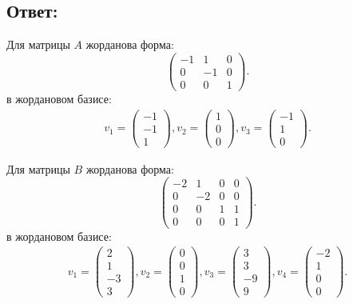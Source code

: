 \documentclass[12pt]{article}
\begin{document}
    \subsection*{Ответ:}
    Для матрицы $A$ жорданова форма:
    \[
        \begin{pmatrix}
            -1 & 1  & 0 \\
            0  & -1 & 0 \\
            0  & 0  & 1
        \end{pmatrix}.
    \]
    в жордановом базисе:
    \begin{gather*}
        v_1 = \begin{pmatrix}
                  -1 \\ -1 \\ 1
        \end{pmatrix},
        v_2 = \begin{pmatrix}
                  1 \\ 0 \\ 0
        \end{pmatrix},
        v_3 = \begin{pmatrix}
                  -1 \\ 1 \\ 0
        \end{pmatrix} .
    \end{gather*}

    Для матрицы $B$ жорданова форма:
    \[
        \begin{pmatrix}
            -2 & 1  & 0 & 0 \\
            0  & -2 & 0 & 0 \\
            0  & 0  & 1 & 1 \\
            0  & 0  & 0 & 1
        \end{pmatrix}.
    \]
    в жордановом базисе:
    \begin{gather*}
        v_1 = \begin{pmatrix}
                  2 \\ 1 \\ -3 \\ 3
        \end{pmatrix} ,
        v_2 = \begin{pmatrix}
                  0 \\ 0 \\ 1 \\ 0
        \end{pmatrix},
        v_3 = \begin{pmatrix}
                  3 \\ 3 \\ -9 \\ 9
        \end{pmatrix},
        v_4 = \begin{pmatrix}
                  -2 \\ 1 \\ 0 \\ 0
        \end{pmatrix}.
    \end{gather*}
\end{document}
